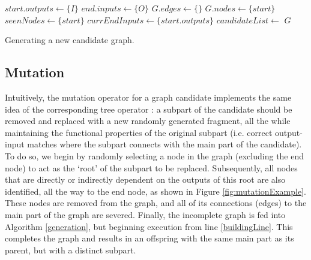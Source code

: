 \documentclass{article}
\begin{document}
\begin{algorithm}
 \setlength{}
 \LinesNumbered
 \SetNlSty{}{}{:}
 $start.outputs \leftarrow \{I\}$\;
 $end.inputs \leftarrow \{O\}$\;
 $G.edges \leftarrow \{\}$\;
 $G.nodes \leftarrow \{start\}$\;
 $seenNodes \leftarrow \{start\}$\;
 $currEndInputs \leftarrow \{start.outputs\}$\;
 $candidateList \leftarrow$ \;
 \;
 \;
 \KwRet $G$\;
 \vspace{2mm}
 \caption{\footnotesize Generating a new candidate graph.}
\label{generation}
\end{algorithm}

\subsection{Mutation}

Intuitively, the mutation operator for a graph candidate implements the same idea of the corresponding tree
operator \cite{aversano2006genetic}: a subpart of the candidate should be removed and replaced with a new randomly generated fragment, all
the while maintaining the functional properties of the original subpart (i.e. correct output-input matches where
the subpart connects with the main part of the candidate). To do so, we begin by randomly selecting a node in the
graph (excluding the end node) to act as the `root' of the subpart to be replaced. Subsequently, all nodes that
are directly or indirectly dependent on the outputs of this root are also identified, all the way to the end node,
as shown in Figure \ref{fig:mutationExample}. These nodes are removed from the graph, and all of its connections (edges) to the main
part of the graph are severed. Finally, the incomplete graph is fed into Algorithm \ref{generation}, but beginning
execution from line \ref{buildingLine}. This completes the graph and results in an offspring with the same main
part as its parent, but with a distinct subpart.
\end{document}
